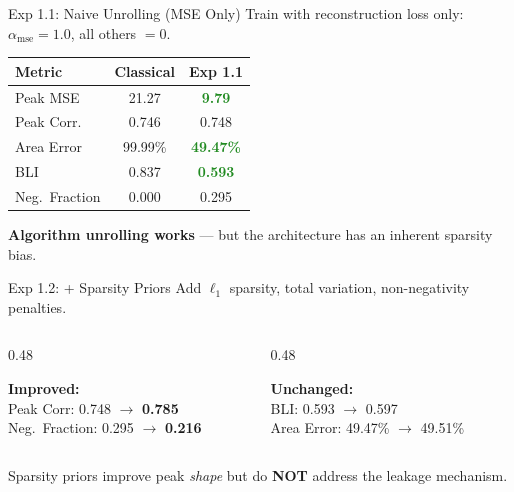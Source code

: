 \documentclass[aspectratio=169, 10pt]{beamer}
\newcommand{\cmark}{\textcolor{forestgreen}{\ding{51}}}
\newcommand{\xmark}{\textcolor{warningred}{\ding{55}}}
\begin{document}
\begin{frame}{Exp 1.1: Naive Unrolling (MSE Only)}
Train with reconstruction loss only: $\alpha_{\text{mse}} = 1.0$, all others $= 0$.

\vspace{0.5em}
\centering
\begin{tabular}{lcc}
\toprule
\textbf{Metric} & \textbf{Classical} & \textbf{Exp 1.1} \\
\midrule
Peak MSE        & 21.27 & \textcolor{forestgreen}{\textbf{9.79}} \cmark \\
Peak Corr.      & 0.746 & 0.748 \\
Area Error      & 99.99\% & \textcolor{forestgreen}{\textbf{49.47\%}} \cmark \\
BLI             & 0.837 & \textcolor{forestgreen}{\textbf{0.593}} \cmark \\
Neg.\ Fraction  & 0.000 & \textcolor{warningred}{0.295} \xmark \\
\bottomrule
\end{tabular}

\vspace{0.8em}
\begin{insightbox}
\textbf{Algorithm unrolling works} --- but the architecture has an inherent sparsity bias.
\end{insightbox}
\end{frame}

\begin{frame}{Exp 1.2: + Sparsity Priors}
Add $\ell_1$ sparsity, total variation, non-negativity penalties.

\vspace{0.5em}
\begin{columns}[T]
\begin{column}{0.48\textwidth}
\begin{resultgood}
\textbf{Improved:}\\[3pt]
Peak Corr: 0.748 $\rightarrow$ \textbf{0.785} \cmark\\
Neg.\ Fraction: 0.295 $\rightarrow$ \textbf{0.216} \cmark
\end{resultgood}
\end{column}
\begin{column}{0.48\textwidth}
\begin{resultbad}
\textbf{Unchanged:}\\[3pt]
BLI: 0.593 $\rightarrow$ 0.597 \xmark\\
Area Error: 49.47\% $\rightarrow$ 49.51\% \xmark
\end{resultbad}
\end{column}
\end{columns}

\vspace{0.8em}
\begin{insightbox}
Sparsity priors improve peak \textit{shape} but do \textbf{NOT} address the leakage mechanism.
\end{insightbox}
\end{frame}
\end{document}
